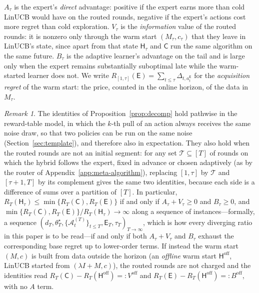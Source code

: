 \documentclass{article}
\theoremstyle{definition}
\theoremstyle{remark}
\newtheorem{remark}{Remark}
\theoremstyle{remark}
\newcommand{\Cold}{\mathsf{C}}
\newcommand{\Exp}{\mathsf{E}}
\newcommand{\Hyb}{\mathsf{H}}
\begin{document}
$A_\tau$ is the expert's \emph{direct} advantage: positive if the expert earns
more than cold LinUCB would have on the routed rounds, negative if the expert's
actions cost more regret than cold exploration. $V_\tau$ is the
\emph{information} value of the routed rounds: it is nonzero only through the
warm start $(M_\tau,c_\tau)$ that they leave in LinUCB's state, since apart
from that state $\Hyb_\tau$ and $\Cold$ run the same algorithm on the same
future. $B_\tau$ is the adaptive learner's advantage on the tail and is large
only when the expert remains substantially suboptimal late while the
warm-started learner does not. We write $R_{[1,\tau]}(\Exp)=\sum_{t\le\tau}\Delta_{t,a_t^{\Exp}}$
for the \emph{acquisition regret} of the warm start: the price, counted in the
online horizon, of the data in $M_\tau$.

\begin{remark}
The identities of Proposition~\ref{prop:decomp} hold pathwise in the
reward-table model, in which the $k$-th pull of an action always receives the
same noise draw, so that two policies can be run on the same noise
(Section~\ref{sec:template}), and therefore also in expectation. They also hold
when the routed rounds are not an initial segment: for any set
$\mathcal T\subseteq[T]$ of rounds on which the hybrid follows the expert,
fixed in advance or chosen adaptively (as by the router of
Appendix~\ref{app:meta-algorithm}), replacing $[1,\tau]$ by $\mathcal T$ and
$[\tau+1,T]$ by its complement gives the same two identities, because each
side is a difference of sums over a partition of $[T]$. In particular,
$R_T(\Hyb_\tau)\le\min\{R_T(\Cold),R_T(\Exp)\}$ if and only if
$A_\tau+V_\tau\ge0$ and $B_\tau\ge0$, and
$\min\{R_T(\Cold),R_T(\Exp)\}/R_T(\Hyb_\tau)\to\infty$ along a sequence of
instances---formally, a sequence
$(d_T,\theta^\star_T,\{\mathcal A^{(T)}_t\}_{t\le T},\Exp_T,\tau_T)_{T\to\infty}$,
which is how every diverging ratio in this paper is to be read---if and only
if both $A_\tau+V_\tau$ and $B_\tau$ exhaust the corresponding base regret up
to lower-order terms. If instead the warm start
$(M,c)$ is built from data outside the horizon (an \emph{offline} warm start
$\Hyb^{\mathrm{off}}$, LinUCB started from $(\lambda I+M,c)$), the routed
rounds are not charged and the identities read
$R_T(\Cold)-R_T(\Hyb^{\mathrm{off}})=:V^{\mathrm{off}}$ and
$R_T(\Exp)-R_T(\Hyb^{\mathrm{off}})=:B^{\mathrm{off}}$, with no $A$ term.
\end{remark}
\end{document}
